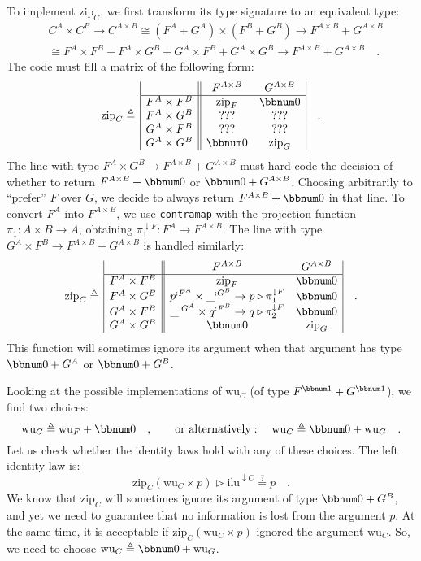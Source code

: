 To implement $\text{zip}_{C}$, we first transform its type signature
to an equivalent type:
\begin{align*}
 & C^{A}\times C^{B}\rightarrow C^{A\times B}\cong(F^{A}+G^{A})\times(F^{B}+G^{B})\rightarrow F^{A\times B}+G^{A\times B}\\
 & \cong F^{A}\times F^{B}+F^{A}\times G^{B}+G^{A}\times F^{B}+G^{A}\times G^{B}\rightarrow F^{A\times B}+G^{A\times B}\quad.
\end{align*}
The code must fill a matrix of the following form:
\[
\text{zip}_{C}\triangleq\,\begin{array}{|c||cc|}
 & F^{A\times B} & G^{A\times B}\\
\hline F^{A}\times F^{B} & \text{zip}_{F} & \bbnum 0\\
F^{A}\times G^{B} & \text{???} & \text{???}\\
G^{A}\times F^{B} & \text{???} & \text{???}\\
G^{A}\times G^{B} & \bbnum 0 & \text{zip}_{G}
\end{array}\quad.
\]
The line with type $F^{A}\times G^{B}\rightarrow F^{A\times B}+G^{A\times B}$
must hard-code the decision of whether to return $F^{A\times B}+\bbnum 0$
or $\bbnum 0+G^{A\times B}$. Choosing arbitrarily to \textsf{``}prefer\textsf{''}
$F$ over $G$, we decide to always return $F^{A\times B}+\bbnum 0$
in that line. To convert $F^{A}$ into $F^{A\times B}$, we use \lstinline!contramap!
with the projection function $\pi_{1}:A\times B\rightarrow A$, obtaining
$\pi_{1}^{\downarrow F}:F^{A}\rightarrow F^{A\times B}$. The line
with type $G^{A}\times F^{B}\rightarrow F^{A\times B}+G^{A\times B}$
is handled similarly:
\[
\text{zip}_{C}\triangleq\,\begin{array}{|c||cc|}
 & F^{A\times B} & G^{A\times B}\\
\hline F^{A}\times F^{B} & \text{zip}_{F} & \bbnum 0\\
F^{A}\times G^{B} & p^{:F^{A}}\times\_^{:G^{B}}\rightarrow p\triangleright\pi_{1}^{\downarrow F} & \bbnum 0\\
G^{A}\times F^{B} & \_^{:G^{A}}\times q^{:F^{B}}\rightarrow q\triangleright\pi_{2}^{\downarrow F} & \bbnum 0\\
G^{A}\times G^{B} & \bbnum 0 & \text{zip}_{G}
\end{array}\quad.
\]
This function will sometimes ignore its argument when that argument
has type $\bbnum 0+G^{A}$ or $\bbnum 0+G^{B}$.

Looking at the possible implementations of $\text{wu}_{C}$ (of type
$F^{\bbnum 1}+G^{\bbnum 1}$), we find two choices:
\[
\text{wu}_{C}\triangleq\text{wu}_{F}+\bbnum 0\quad,\quad\quad\text{or alternatively}:\quad\text{wu}_{C}\triangleq\bbnum 0+\text{wu}_{G}\quad.
\]
Let us check whether the identity laws hold with any of these choices.
The left identity law is:
\[
\text{zip}_{C}(\text{wu}_{C}\times p)\triangleright\text{ilu}^{\downarrow C}\overset{?}{=}p\quad.
\]
We know that $\text{zip}_{C}$ will sometimes ignore its argument
of type $\bbnum 0+G^{B}$, and yet we need to guarantee that no information
is lost from the argument $p$. At the same time, it is acceptable
if $\text{zip}_{C}(\text{wu}_{C}\times p)$ ignored the argument $\text{wu}_{C}$.
So, we need to choose $\text{wu}_{C}\triangleq\bbnum 0+\text{wu}_{G}$. 

